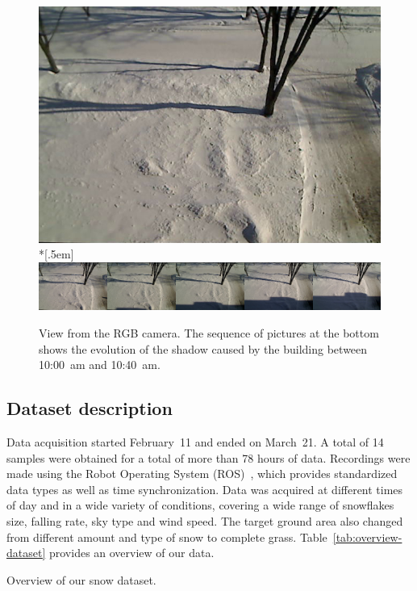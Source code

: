 \begin{figure}[th]
    \centering
    \includegraphics[width=0.90\linewidth]{./img/camera_view.jpg}\\*[.5em]
    \includegraphics[width=0.90\linewidth]{./img/shadow2.png}
    \caption{View from the RGB camera. The sequence of pictures at the bottom shows the evolution of the shadow caused by the building between 10:00~am and 10:40~am.}
    \label{fig:view}
\end{figure}

\subsection{Dataset description} %
Data acquisition started February~11 and ended on March~21. A total of 14 samples were obtained for a total of more than 78 hours of data. Recordings were made using the Robot Operating System (ROS)~\cite{ROSWeb}, which provides standardized data types as well as time synchronization. Data was acquired at different times of day and in a wide variety of conditions, covering a wide range of snowflakes size, falling rate, sky type and wind speed. The target ground area also changed from different amount and type of snow to complete grass. Table~\ref{tab:overview-dataset} provides an overview of our data. 

\begin{table}
\caption{Overview of our snow dataset. }
\label{tab:overview-dataset}
\end{table}




